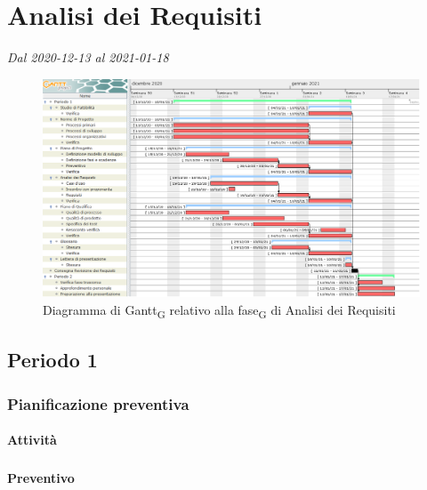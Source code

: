 \section{Analisi dei Requisiti}
\textit{Dal 2020-12-13 al 2021-01-18}


\begin{figure}[H]
	\centering
	\includegraphics[scale=0.43]{res/images/gantt_fase/02_gantt_analisi_requisiti.png}
	\caption{Diagramma di Gantt\textsubscript{G} relativo alla fase\textsubscript{G} di Analisi dei Requisiti}
\end{figure}


\subsection{Periodo 1}

\subsubsection{Pianificazione preventiva}

\paragraph{Attività}
\subparagraph*{}

\planningTable{
	
}


\paragraph{Preventivo}
\subparagraph*{}

